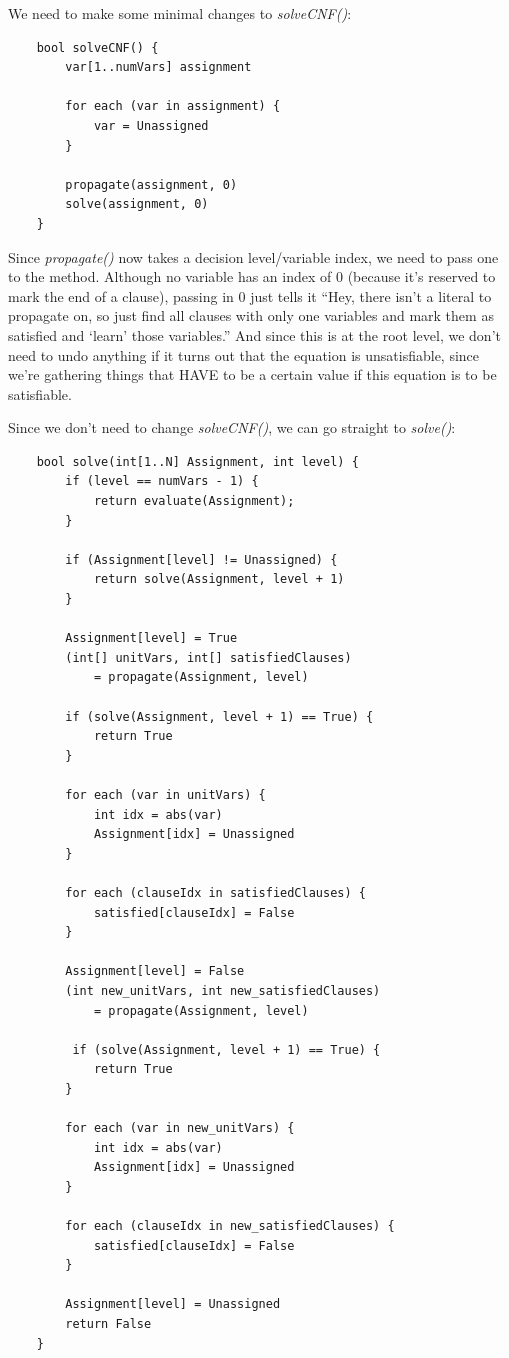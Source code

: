 \documentclass[../main.tex]{subfiles}
\begin{document}
We need to make some minimal changes to \textit{solveCNF()}:

\begin{lstlisting}
    bool solveCNF() {
        var[1..numVars] assignment

        for each (var in assignment) {
            var = Unassigned
        }

        propagate(assignment, 0)
        solve(assignment, 0)
    }
\end{lstlisting}

Since \textit{propagate()} now takes a decision level/variable index, we need to pass 
one to the method. Although no variable has an index of 0 (because it's reserved to mark the 
end of a clause), passing in $0$ just tells it ``Hey, there isn't a literal to propagate on,
so just find all clauses with only one variables and mark them as satisfied and `learn' those 
variables.'' And since this is at the root level, we don't need to undo anything if it turns out 
that the equation is unsatisfiable, since we're gathering things that HAVE to be a certain value 
if this equation is to be satisfiable.

Since we don't need to change \textit{solveCNF()}, we can go straight to \textit{solve()}:

\begin{lstlisting}
    bool solve(int[1..N] Assignment, int level) {
        if (level == numVars - 1) {
            return evaluate(Assignment);
        }

        if (Assignment[level] != Unassigned) {
            return solve(Assignment, level + 1)
        }

        Assignment[level] = True
        (int[] unitVars, int[] satisfiedClauses) 
            = propagate(Assignment, level)

        if (solve(Assignment, level + 1) == True) {
            return True
        }

        for each (var in unitVars) {
            int idx = abs(var)
            Assignment[idx] = Unassigned
        }

        for each (clauseIdx in satisfiedClauses) {
            satisfied[clauseIdx] = False
        }

        Assignment[level] = False
        (int new_unitVars, int new_satisfiedClauses) 
            = propagate(Assignment, level)

         if (solve(Assignment, level + 1) == True) {
            return True
        }

        for each (var in new_unitVars) {
            int idx = abs(var)
            Assignment[idx] = Unassigned
        }

        for each (clauseIdx in new_satisfiedClauses) {
            satisfied[clauseIdx] = False
        }

        Assignment[level] = Unassigned
        return False
    }
\end{lstlisting}
\end{document}
